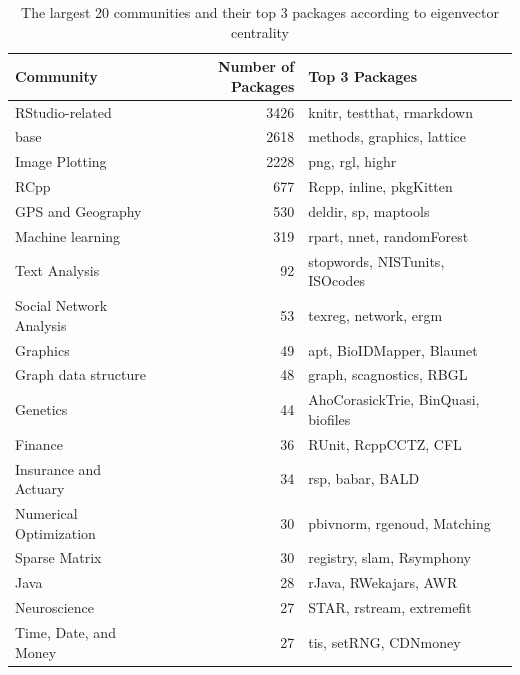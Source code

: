 \begin{table}

\caption{\label{tab:table2}The largest 20 communities and their top 3 packages according to eigenvector centrality}
\centering
\begin{tabular}[t]{l|r|l}
\hline
Community & Number of Packages & Top 3 Packages\\
\hline
RStudio-related & 3426 & knitr, testthat, rmarkdown\\
\hline
base & 2618 & methods, graphics, lattice\\
\hline
Image Plotting & 2228 & png, rgl, highr\\
\hline
RCpp & 677 & Rcpp, inline, pkgKitten\\
\hline
GPS and Geography & 530 & deldir, sp, maptools\\
\hline
Machine learning & 319 & rpart, nnet, randomForest\\
\hline
Text Analysis & 92 & stopwords, NISTunits, ISOcodes\\
\hline
Social Network Analysis & 53 & texreg, network, ergm\\
\hline
Graphics & 49 & apt, BioIDMapper, Blaunet\\
\hline
Graph data structure & 48 & graph, scagnostics, RBGL\\
\hline
Genetics & 44 & AhoCorasickTrie, BinQuasi, biofiles\\
\hline
Finance & 36 & RUnit, RcppCCTZ, CFL\\
\hline
Insurance and Actuary & 34 & rsp, babar, BALD\\
\hline
Numerical Optimization & 30 & pbivnorm, rgenoud, Matching\\
\hline
Sparse Matrix & 30 & registry, slam, Rsymphony\\
\hline
Java & 28 & rJava, RWekajars, AWR\\
\hline
Neuroscience & 27 & STAR, rstream, extremefit\\
\hline
Time, Date, and Money & 27 & tis, setRNG, CDNmoney\\
\hline
\end{tabular}
\end{table}


